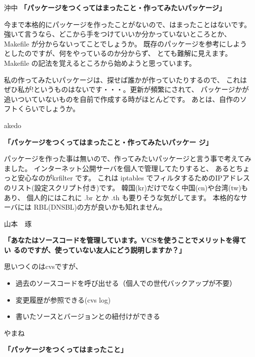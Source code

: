 \documentclass[cjk,dvipdfmx,12pt]{beamer}
\begin{document}
\begin{frame}{沖中}
\textbf{「パッケージをつくってはまったこと・作ってみたいパッケージ」}

今まで本格的にパッケージを作ったことがないので、はまったことはないです。
強いて言うなら、どこから手をつけていいか分かっていないところとか、
Makefile が分からないってことでしょうか。
既存のパッケージを参考にしようとしたのですが、何をやっているのか分からず、
とても難解に見えます。Makefile の記法を覚えるところから始めようと思っています。

私の作ってみたいパッケージは、探せば誰かが作っていたりするので、
これはぜひ私が!というものはないです・・・。更新が頻繁にされて、
パッケージかが追いついていないものを自前で作成する時がほとんどです。
あとは、自作のソフトくらいでしょうか。

\end{frame}\begin{frame}{akedo}

\textbf{「パッケージをつくってはまったこと・作ってみたいパッケー
   ジ」}

パッケージを作った事は無いので、作ってみたいパッケージと言う事で考えてみました。
インターネット公開サーバを個人で管理してたりすると、
あるとちょっと安心なのがkrfilter です。
これは iptables でフィルタするためのIPアドレスのリスト(設定スクリプト付き)です。
韓国(kr)だけでなく中国(cn)や台湾(tw)もあり、
個人的にはこれに .br とか .th も要りそうな気がしてます。
本格的なサーバには RBL(DNSBL)の方が良いかも知れません。

\end{frame}\begin{frame}{山本　琢}

\textbf{「あなたはソースコードを管理しています。VCSを使うことでメリットを得てい
るのですが、使っていない友人にどう説明しますか？」}

思いつくのはcvsですが、

\begin{itemize}
 \item  過去のソースコードを呼び出せる（個人での世代バックアップが不要）
 \item  変更履歴が参照できる(cvs log)
 \item  書いたソースとバージョンとの紐付けができる
\end{itemize}


\end{frame}\begin{frame}{やまね}

\textbf{「パッケージをつくってはまったこと」}
\begin{itemize}
 

\end{itemize}
\end{frame}
\end{document}
